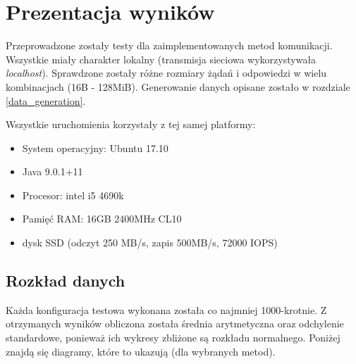 \chapter{Prezentacja wyników}

Przeprowadzone zostały testy dla zaimplementowanych metod komunikacji. Wszystkie miały charakter lokalny (transmisja sieciowa wykorzystywała \textit{localhost}). Sprawdzone zostały różne rozmiary żądań i odpowiedzi w wielu kombinacjach (16B - 128MiB). Generowanie danych opisane zostało w rozdziale \ref{data_generation}.

Wszystkie uruchomienia korzystały z tej samej platformy:
\begin{itemize}
    \item System operacyjny: Ubuntu 17.10
    \item Java 9.0.1+11
    \item Procesor: intel i5 4690k
    \item Pamięć RAM: 16GB 2400MHz CL10
    \item dysk SSD (odczyt 250 MB/s, zapis 500MB/s, 72000 IOPS)
\end{itemize}


\section{Rozkład danych}

Każda konfiguracja testowa wykonana została co najmniej 1000-krotnie. Z otrzymanych wyników obliczona została średnia arytmetyczna oraz odchylenie standardowe, ponieważ ich wykresy zbliżone są rozkładu normalnego. Poniżej znajdą się diagramy, które to ukazują (dla wybranych metod).

\vspace{5mm} 




